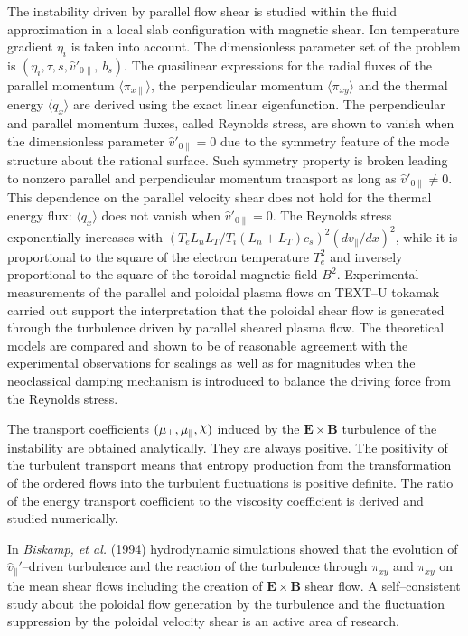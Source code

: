 \documentclass[a4paper,openany,12pt]{book}
\def\chix{\raise.5ex\hbox{$\chi$}}
\begin{document}
{The instability driven by parallel flow shear is studied within the fluid approximation in a local slab configuration with magnetic shear. Ion temperature gradient $\eta_i$ is taken into account. The dimensionless parameter set of the problem is $(\eta_i, \tau, s, \widehat v'_{0\|},\ b_s)$. The quasilinear expressions for the radial fluxes of the parallel momentum $\langle\pi_{x\|}\rangle$, the perpendicular momentum $\langle\pi_{xy}\rangle$ and the thermal energy 
$\langle q_x\rangle$ are derived using the exact linear eigenfunction. The perpendicular and parallel momentum fluxes, called Reynolds stress, are shown to vanish when the dimensionless parameter $\widehat v'_{0\|}=0$ due to the symmetry feature of the mode structure about the rational surface. Such symmetry property is broken leading to nonzero parallel and perpendicular momentum transport as long as $\widehat v'_{0\|}\ne 0$. This dependence on the parallel velocity shear does not hold for the thermal energy flux: $\langle q_x\rangle$ does not vanish when $\widehat v'_{0\|}=0$. The Reynolds stress exponentially increases with $(T_eL_nL_T/T_i(L_n+L_T)c_s)^2(dv_\|/dx)^2$, while it is proportional to the square of the electron temperature $T_e^2$ and inversely proportional to the square of the toroidal magnetic field $B^2$. Experimental measurements of the parallel and poloidal plasma flows on TEXT--U tokamak carried out support the interpretation that the poloidal shear flow is generated through the turbulence driven by parallel sheared plasma flow. The theoretical models are compared and shown to be of reasonable agreement with the experimental observations for scalings as well as for magnitudes when the neoclassical damping mechanism is introduced to balance the driving force from the Reynolds stress.

The transport coefficients $(\mu_\perp, \mu_\|, \chix)$ induced by the $\bm{E\times B}$ turbulence of the instability are obtained analytically. They are always positive. The positivity of the turbulent transport means that entropy production from the transformation of the ordered flows into the turbulent fluctuations is positive definite. The ratio of the energy transport coefficient to the viscosity coefficient is derived and studied numerically.

In \emph{Biskamp, et al.} (1994) hydrodynamic simulations showed that the evolution of $\widehat v_\|'$--driven turbulence and the reaction of the turbulence through $\pi_{xy}$ and $\pi_{xy}$ on the mean shear flows including the creation of $\bm{E\times B}$ shear flow. A self--consistent study about the poloidal flow generation by the turbulence and the fluctuation suppression by the poloidal velocity shear is an active area of research.

}
\end{document}
